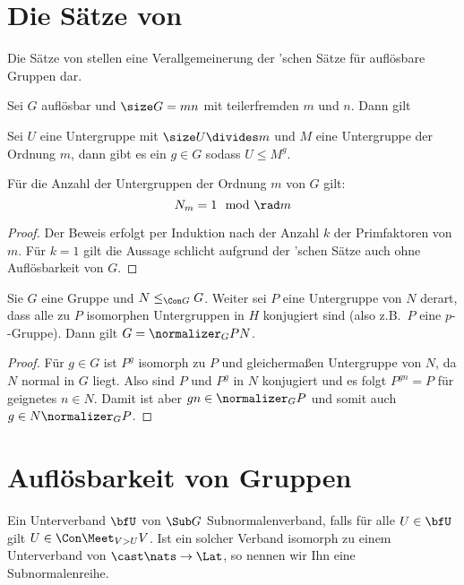 \section{Die Sätze von }

Die Sätze von  stellen eine Verallgemeinerung der 'schen Sätze für auflösbare Gruppen dar.

\begin{theorem}
    Sei $G$ auflösbar und $\size G = mn$ mit teilerfremden $m$ und $n$. Dann gilt
    \begin{statements}
        \item Sei $U$ eine Untergruppe mit $\size U \divides m$ und $M$ eine Untergruppe der Ordnung $m$, dann gibt es ein $g\in G$
    sodass $U\leq M^g$.
        \item Für die Anzahl der Untergruppen der Ordnung $m$ von $G$ gilt:
    $$
    N_m = 1 \mod \rad m
    $$
    \end{statements}
\end{theorem}

\begin{proof}
    Der Beweis erfolgt per Induktion nach der Anzahl $k$ der Primfaktoren von $m$. Für $k=1$ gilt die Aussage schlicht aufgrund der
    'schen Sätze auch ohne Auflösbarkeit von $G$.
\end{proof}

\begin{theorem}
    Sie $G$ eine Gruppe und $N\leq_{\Con G} G$. Weiter sei $P$ eine Untergruppe von $N$ derart, dass alle zu $P$ isomorphen
    Untergruppen in $H$ konjugiert sind (also z.B.~$P$ eine $p$--Gruppe). Dann gilt
    $G = \normalizer_G P N$.
\end{theorem}

\begin{proof}
    Für $g\in G$ ist $P^g$ isomorph zu $P$ und gleichermaßen Untergruppe von $N$, da $N$ normal in $G$ liegt. Also sind $P$ und $P^g$ in $N$
    konjugiert und es folgt $P^{gn}=P$ für geignetes $n\in N$. Damit ist aber $gn\in \normalizer_G P$ und somit auch $g\in N
    \normalizer_G P$.
\end{proof}

\section{Auflösbarkeit von Gruppen}

\begin{definition}
    Ein Unterverband $\bfU$ von $\Sub G$ Subnormalenverband, falls für alle $U\in \bfU$ gilt
    $U\in\Con \Meet_{V>U}V$. Ist ein solcher Verband isomorph zu einem Unterverband von $\cast \nats \to \Lat$, so nennen wir Ihn
    eine Subnormalenreihe. 
\end{definition}

